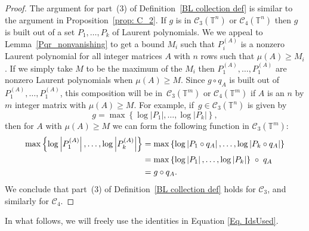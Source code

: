 \documentclass[12pt]{amsart}
\theoremstyle{plain}
\theoremstyle{definition}
\theoremstyle{remark}
\numberwithin{theorem}{section}
\numberwithin{equation}{section} %
\newcommand{\mc}{\mathcal}
\newcommand{\torus}{{\mathbb{T}}}
\begin{document}
\begin{proof}
The argument for part~(3) of Definition~\ref{BL collection def} is similar to the argument in Proposition~\ref{prop: C_2}.
If $g$ is in $\mc C_3 (\torus^n)$ or $\mc C_4 (\torus^n)$ then $g$ is built out of a set $P_1, \ldots, P_k$ of Laurent polynomials. 
We  we appeal to Lemma~\ref{Pqr_nonvanishing} to get a bound $M_i$ such that $P_i^{(A)}$ is a nonzero Laurent polynomial for all
integer matrices $A$ with $n$ rows such that $\mu(A) \ge M_i$.  If we simply take $M$ to be the maximum of the $M_i$ then
$P_1^{(A)}, \ldots, P_1^{(A)}$ are nonzero Laurent polynomials when $\mu(A) \ge M$.
Since $g \circ q_A$ is built out of $P_1^{(A)}, \ldots, P_1^{(A)}$, this composition will be in~$\mc C_3 (\torus^m)$ or $\mc C_4 (\torus^m)$ if $A$ is an $n$ by $m$ integer matrix with $\mu(A) \ge M$.
For example, if~$g \in \mc C_3(\torus^n)$ is given by
$$
g =   \max \left\{ 
    \log | P_1 |, \ldots, \log| P_k| 
    \right\},
$$
then for $A$ with $\mu(A) \ge M$ we can form the following function in $\mc C_3(\torus^m)$:
\begin{equation}\label{Eq. IdsUsed}
    \begin{split}
        \max \left\{ 
    \log \left| P^{(A)}_1 \right|, \ldots, \log\left| P^{(A)}_k \vphantom{P^{(A)}_1}\right| 
    \right\} 
    &= \max \left\{ 
    \log \left| P_1 \circ q_A \right|, \ldots, \log\left|  P_k\circ q_A\right|      \right\} \\
       &=
        \max \left\{  \log \left| P_1  \right|, \ldots, \log\left|  P_k\right|      \right\}  \; \circ \; q_A \\
        &=
        g \circ q_A.
    \end{split}
\end{equation}
We conclude that  part~(3) of Definition~\ref{BL collection def} holds for $\mc C_3$, and similarly for $\mc C_4$.
\end{proof}

In what follows, we will freely use the identities in Equation \eqref{Eq. IdsUsed}.
\end{document}

